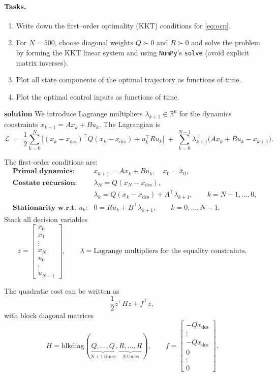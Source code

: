 \documentclass{article}
\begin{document}
\paragraph{Tasks.}
\begin{enumerate}
  \item Write down the first–order optimality (KKT) conditions for \eqref{eq:ocp}.
  \item For $N=500$, choose diagonal weights $Q \succ 0$ and $R \succ 0$ and solve the problem by forming the KKT linear system and using \texttt{NumPy}'s \texttt{solve} (avoid explicit matrix inverses).
  \item Plot all state components of the optimal trajectory as functions of time.
  \item Plot the optimal control inputs as functions of time.
\end{enumerate}
\textbf{solution}
We introduce Lagrange multipliers $\lambda_{k+1}\in\mathbb{R}^{6}$ for the dynamics constraints 
$x_{k+1}=A x_k + B u_k$.  
The Lagrangian is
\[
\mathcal{L} \;=\; 
\frac{1}{2}\sum_{k=0}^{N}\Big[(x_k - x_{\mathrm{des}})^\top Q (x_k - x_{\mathrm{des}}) 
+ u_k^\top R u_k \Big]
\;+\;
\sum_{k=0}^{N-1} \lambda_{k+1}^\top \big(Ax_k + Bu_k - x_{k+1}\big).
\]

The first-order conditions are:
\begin{align}
&\textbf{Primal dynamics:} 
&& x_{k+1} = A x_k + B u_k, 
\quad x_0 = \bar{x}_0,
\\[1ex]
&\textbf{Costate recursion:} 
&& \lambda_N = Q(x_N - x_{\mathrm{des}}), \\
&&& \lambda_k = Q(x_k - x_{\mathrm{des}}) + A^\top \lambda_{k+1},
\qquad k = N-1,\dots,0,
\\[1ex]
&\textbf{Stationarity w.r.t. $u_k$:} 
&& 0 = R u_k + B^\top \lambda_{k+1},
\qquad k = 0,\dots,N-1.
\end{align}
Stack all decision variables
\[
z = \begin{bmatrix}
x_0 \\ x_1 \\ \vdots \\ x_N \\ u_0 \\ \vdots \\ u_{N-1}
\end{bmatrix},
\qquad 
\lambda = \text{Lagrange multipliers for the equality constraints.}
\]

The quadratic cost can be written as
\[
\frac{1}{2} z^\top H z + f^\top z,
\]
with block diagonal matrices
\[
H = \mathrm{blkdiag}(\underbrace{Q,\dots,Q}_{N+1\ \text{times}}, 
\underbrace{R,\dots,R}_{N\ \text{times}}), 
\qquad
f = \begin{bmatrix}
- Q x_{\mathrm{des}} \\ \vdots \\ - Q x_{\mathrm{des}} \\ 0 \\ \vdots \\ 0
\end{bmatrix}.
\]
\end{document}
